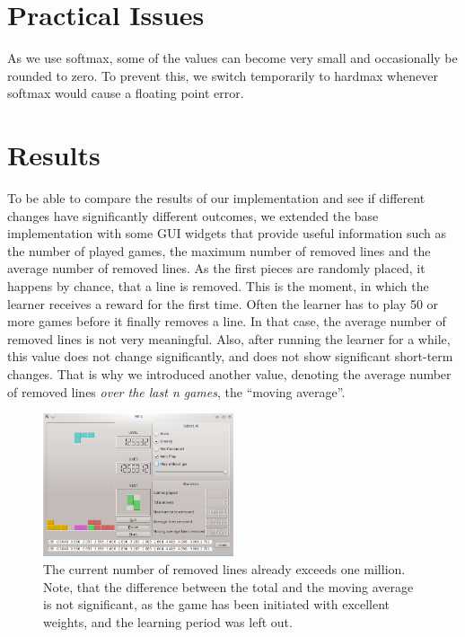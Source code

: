 \documentclass{ml}
\begin{document}
\section{Practical Issues}

As we use softmax, some of the values can become very small and occasionally be rounded to zero. 
To prevent this, we switch temporarily to hardmax whenever softmax would cause a floating point error.


\section{Results}
\label{results}

To be able to compare the results of our implementation and see if different changes have significantly different outcomes, we extended the base implementation with some GUI widgets that provide useful information such as the number of played games, the maximum number of removed lines and the average number of removed lines. As the first pieces are randomly placed, it happens by chance, that a line is removed. This is the moment, in which the learner receives a reward for the first time. Often the learner has to play 50 or more games  before it finally removes a line. In that case, the average number of removed lines is not very meaningful. Also, after running the learner for a while, this value does not change significantly, and does not show significant short-term changes. That is why we introduced another value, denoting the average number of removed lines \textit{over the last n games}, the ``moving average''.

\begin{figure}
  \vspace{-5pt}
  \begin{center}
    \includegraphics[width=0.5\textwidth]{img/three.png}
  \end{center}
  \vspace{-15pt}
  \caption{\small{The current number of removed lines already exceeds one million. Note, that the difference between the total and the moving average is not significant, as the game has been initiated with excellent weights, and the learning period was left out.}}
  \label{three}
  \vspace{-5pt}
\end{figure}
\end{document}
